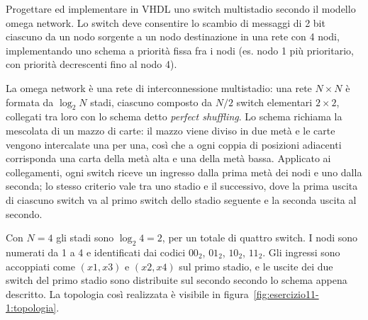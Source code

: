 \label{sec:esercizio11-1}

\begin{traccia}
Progettare ed implementare in VHDL uno switch multistadio secondo il modello omega network. Lo switch deve consentire lo scambio di messaggi di 2 bit ciascuno da un nodo sorgente a un nodo destinazione in una rete con 4 nodi, implementando uno schema a priorità fissa fra i nodi (es. nodo 1 più prioritario, con priorità decrescenti fino al nodo 4).
\end{traccia}

\progetto

La omega network è una rete di interconnessione multistadio: una rete $N \times N$ è formata da $\log_2 N$ stadi, ciascuno composto da $N/2$ switch elementari $2 \times 2$, collegati tra loro con lo schema detto \emph{perfect shuffling}. Lo schema richiama la mescolata di un mazzo di carte: il mazzo viene diviso in due metà e le carte vengono intercalate una per una, così che a ogni coppia di posizioni adiacenti corrisponda una carta della metà alta e una della metà bassa. Applicato ai collegamenti, ogni switch riceve un ingresso dalla prima metà dei nodi e uno dalla seconda; lo stesso criterio vale tra uno stadio e il successivo, dove la prima uscita di ciascuno switch va al primo switch dello stadio seguente e la seconda uscita al secondo.

Con $N=4$ gli stadi sono $\log_2 4 = 2$, per un totale di quattro switch. I nodi sono numerati da 1 a 4 e identificati dai codici $00_2$, $01_2$, $10_2$, $11_2$. Gli ingressi sono accoppiati come $(x1, x3)$ e $(x2, x4)$ sul primo stadio, e le uscite dei due switch del primo stadio sono distribuite sul secondo secondo lo schema appena descritto. La topologia così realizzata è visibile in figura~\ref{fig:esercizio11-1:topologia}.

